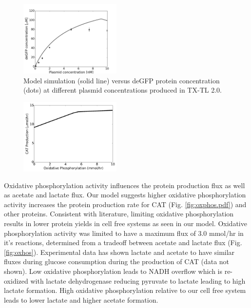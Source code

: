 \documentclass[12pt]{article}
\begin{document}
\begin{figure}[!t]\centering
\includegraphics[width=0.45\textwidth]{./figures/deGFP_Plasmid.png}
\caption{Model simulation (solid line) versus deGFP protein concentration (dots) at different plasmid concentrations produced in TX-TL 2.0. 
}
\label{fig:deGFP_Plasmid}
\end{figure}

\begin{figure}[!t]\centering
\includegraphics[width=0.45\textwidth]{./figures/CAT_oxphos.pdf}
\caption{
}
\label{fig:CAT_oxphos}
\end{figure}

Oxidative phosphorylation activity influences the protein production flux as well as acetate and lactate flux.    
Our model suggests higher oxidative phosphorylation activity increases the protein production rate for CAT (Fig. \ref{fig:oxphos.pdf}) and other proteins. 
Consistent with literature, limiting oxidative phosphorylation results in lower protein yields in cell free systems as seen in our model. 
Oxidative phosphorylation activity was limited to have a maximum flux of 3.0 mmol/hr in it's reactions, determined from a tradeoff between acetate and lactate flux (Fig. \ref{fig:oxhos}). 
Experimental data has shown lactate and acetate to have similar fluxes during glucose consumption during the production of CAT (data not shown).
Low oxidative phosphorylation leads to NADH overflow which is re-oxidized with lactate dehydrogenase reducing pyruvate to lactate leading to high lactate formation.
High oxidative phosphorylation relative to our cell free system leads to lower lactate and higher acetate formation.
\end{document}
